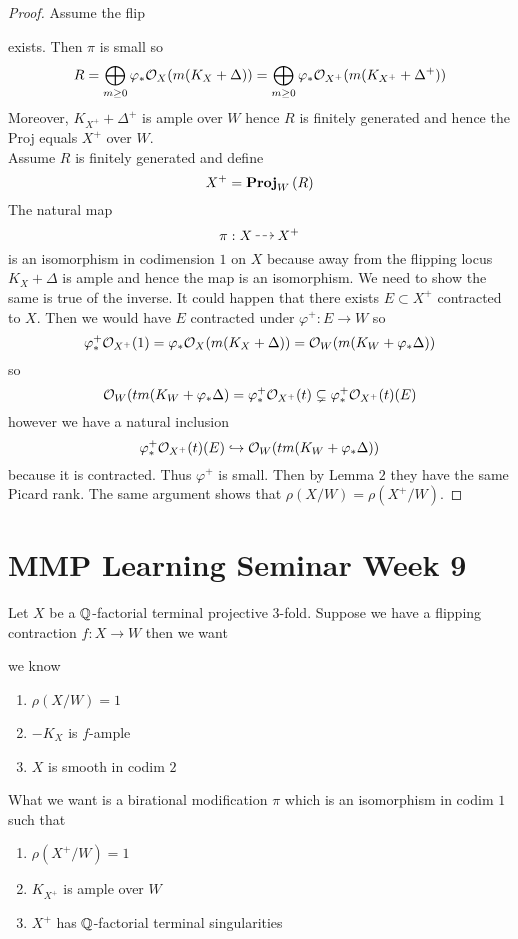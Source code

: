 \documentclass[12pt]{article}
\begin{document}
\begin{proof}
Assume the flip
\begin{center}
\end{center}
exists. Then $\pi$ is small so 
\[ R = \bigoplus_{m \ge 0} \varphi_* \mathcal{O}_{X}(m(K_X + \Delta)) = \bigoplus_{m \ge 0} \varphi_* \mathcal{O}_{X^+}(m(K_{X^+} + \Delta^+)) \]
Moreover, $K_{X^+} + \Delta^{+}$ is ample over $W$ hence $R$ is finitely generated and hence the Proj equals $X^+$ over $W$. 
\bigskip\\
Assume $R$ is finitely generated and define 
\[ X^+ = \mathbf{Proj}_{W}\left( R \right) \]
The natural map
\[ \pi : X \rat X^+ \]
is an isomorphism in codimension $1$ on $X$ because away from the flipping locus $K_X + \Delta$ is ample and hence the map is an isomorphism. We need to show the same is true of the inverse. It could happen that there exists $E \subset X^+$ contracted to $X$. Then we would have $E$ contracted under $\varphi^+ : E \to W$ so 
\[ \varphi_*^+ \mathcal{O}_{X^+}(1) = \varphi_* \mathcal{O}_{X}(m(K_X + \Delta)) = \mathcal{O}_{W}(m(K_{W} + \varphi_* \Delta))  \]
so 
\[ \mathcal{O}_{W}(tm (K_W + \varphi_* \Delta) = \varphi^+_* \mathcal{O}_{X^+}(t) \subsetneq \varphi_*^+ \mathcal{O}_{X^+}(t)(E) \]
however we have a natural inclusion
\[ \varphi_*^+ \mathcal{O}_{X^+}(t)(E) \hookrightarrow \mathcal{O}_{W}(tm (K_W + \varphi_* \Delta)) \]
because it is contracted. Thus $\varphi^+$ is small. Then by Lemma $2$ they have the same Picard rank. The same argument shows that $\rho(X/W) = \rho(X^+/W)$.
\end{proof}

\section{MMP Learning Seminar Week 9}

Let $X$ be a $\mathbb{Q}$-factorial terminal projective $3$-fold. Suppose we have a flipping contraction $f :  X \to W$ then we want
\begin{center}
\end{center}
we know 
\begin{enumerate}
\item $\rho(X/W) = 1$
\item $-K_X$ is $f$-ample
\item $X$ is smooth in codim $2$
\end{enumerate}
What we want is a birational modification $\pi$ which is an isomorphism in codim $1$ such that
\begin{enumerate}
\item $\rho(X^+/W) = 1$
\item $K_{X^+}$ is ample over $W$
\item $X^+$ has $\mathbb{Q}$-factorial terminal singularities 
\end{enumerate}
\end{document}
